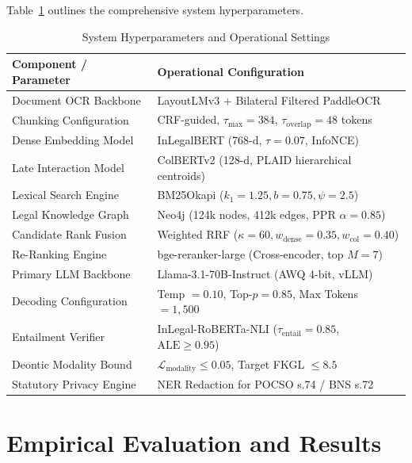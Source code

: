 \documentclass[conference]{IEEEtran}
\begin{document}
Table~\ref{tab:hyperparameters} outlines the comprehensive system hyperparameters.

\begin{table}[!t]
\caption{System Hyperparameters and Operational Settings}
\label{tab:hyperparameters}
\centering
\small
\begin{tabularx}{\columnwidth}{lX}
\toprule
\textbf{Component / Parameter} & \textbf{Operational Configuration} \\
\midrule
Document OCR Backbone & LayoutLMv3 + Bilateral Filtered PaddleOCR \\
Chunking Configuration & CRF-guided, $\tau_{\max}=384$, $\tau_{\text{overlap}}=48$ tokens \\
Dense Embedding Model & InLegalBERT (768-d, $\tau=0.07$, InfoNCE) \\
Late Interaction Model & ColBERTv2 (128-d, PLAID hierarchical centroids) \\
Lexical Search Engine & BM25Okapi ($k_1=1.25, b=0.75, \psi=2.5$) \\
Legal Knowledge Graph & Neo4j (124k nodes, 412k edges, PPR $\alpha=0.85$) \\
Candidate Rank Fusion & Weighted RRF ($\kappa=60, w_{\text{dense}}=0.35, w_{\text{col}}=0.40$) \\
Re-Ranking Engine & bge-reranker-large (Cross-encoder, top $M=7$) \\
Primary LLM Backbone & Llama-3.1-70B-Instruct (AWQ 4-bit, vLLM) \\
Decoding Configuration & Temp $=0.10$, Top-$p=0.85$, Max Tokens $=1,500$ \\
Entailment Verifier & InLegal-RoBERTa-NLI ($\tau_{\text{entail}}=0.85$, $\text{ALE}\ge 0.95$) \\
Deontic Modality Bound & $\mathcal{L}_{\text{modality}} \le 0.05$, Target FKGL $\le 8.5$ \\
Statutory Privacy Engine & NER Redaction for POCSO s.74 / BNS s.72 \\
\bottomrule
\end{tabularx}
\end{table}

\section{Empirical Evaluation and Results}
\end{document}
